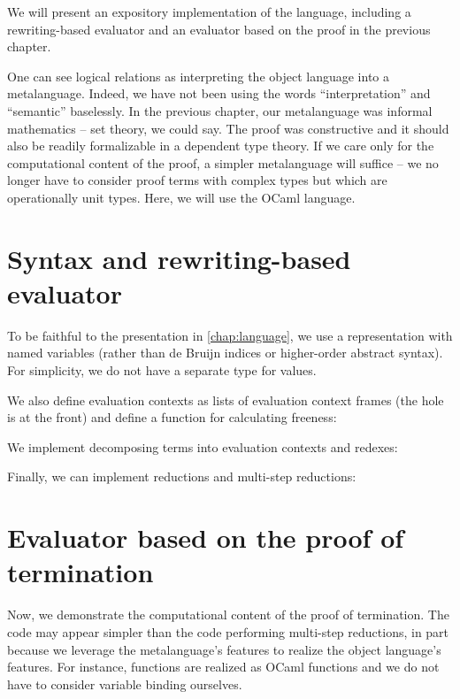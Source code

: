 \documentclass[a4paper, 11pt,titlepage, openright, twoside]{report}
\newcommand{\+}{\enspace}
\begin{document}
We will present an expository implementation of the language,
including a rewriting-based evaluator and an evaluator based on the proof in the previous chapter.

One can see logical relations as interpreting the object language into a metalanguage.
Indeed, we have not been using the words ``interpretation'' and ``semantic'' baselessly.
In the previous chapter, our metalanguage was informal mathematics – set theory, we could say.
The proof was constructive and it should also be readily formalizable in a dependent type theory.
If we care only for the computational content of the proof, a simpler metalanguage will suffice –
we no longer have to consider proof terms with complex types but which are operationally unit types.
Here, we will use the OCaml language.

\section{Syntax and rewriting-based evaluator}

To be faithful to the presentation in \autoref{chap:language},
we use a representation with named variables (rather than de Bruijn indices
or higher-order abstract syntax).
For simplicity, we do not have a separate type for values.





We also define evaluation contexts as lists of evaluation context frames
(the hole is at the front)
and define a function for calculating freeness:



We implement decomposing terms into evaluation contexts and redexes:



Finally, we can implement reductions and multi-step reductions:



\section{Evaluator based on the proof of termination}

Now, we demonstrate the computational content of the proof of termination.
The code may appear simpler than the code performing multi-step reductions,
in part because we leverage
the metalanguage's features to realize the object language's features.
For instance, functions are realized as OCaml functions and
we do not have to consider variable binding ourselves.
\end{document}
